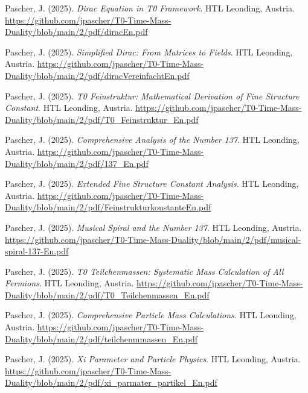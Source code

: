 \documentclass{article}
\begin{document}
\begin{thebibliography}{99}
		Pascher, J. (2025).
		\textit{Dirac Equation in T0 Framework}.
		HTL Leonding, Austria.
		\url{https://github.com/jpascher/T0-Time-Mass-Duality/blob/main/2/pdf/diracEn.pdf}
		
		Pascher, J. (2025).
		\textit{Simplified Dirac: From Matrices to Fields}.
		HTL Leonding, Austria.
		\url{https://github.com/jpascher/T0-Time-Mass-Duality/blob/main/2/pdf/diracVereinfachtEn.pdf}
		
		
		Pascher, J. (2025).
		\textit{T0 Feinstruktur: Mathematical Derivation of Fine Structure Constant}.
		HTL Leonding, Austria.
		\url{https://github.com/jpascher/T0-Time-Mass-Duality/blob/main/2/pdf/T0_Feinstruktur_En.pdf}
		
		Pascher, J. (2025).
		\textit{Comprehensive Analysis of the Number 137}.
		HTL Leonding, Austria.
		\url{https://github.com/jpascher/T0-Time-Mass-Duality/blob/main/2/pdf/137_En.pdf}
		
		Pascher, J. (2025).
		\textit{Extended Fine Structure Constant Analysis}.
		HTL Leonding, Austria.
		\url{https://github.com/jpascher/T0-Time-Mass-Duality/blob/main/2/pdf/FeinstrukturkonstanteEn.pdf}
		
		Pascher, J. (2025).
		\textit{Musical Spiral and the Number 137}.
		HTL Leonding, Austria.
		\url{https://github.com/jpascher/T0-Time-Mass-Duality/blob/main/2/pdf/musical-spiral-137-En.pdf}
		
		
		Pascher, J. (2025).
		\textit{T0 Teilchenmassen: Systematic Mass Calculation of All Fermions}.
		HTL Leonding, Austria.
		\url{https://github.com/jpascher/T0-Time-Mass-Duality/blob/main/2/pdf/T0_Teilchenmassen_En.pdf}
		
		Pascher, J. (2025).
		\textit{Comprehensive Particle Mass Calculations}.
		HTL Leonding, Austria.
		\url{https://github.com/jpascher/T0-Time-Mass-Duality/blob/main/2/pdf/teilchenmmassen_En.pdf}
		
		Pascher, J. (2025).
		\textit{Xi Parameter and Particle Physics}.
		HTL Leonding, Austria.
		\url{https://github.com/jpascher/T0-Time-Mass-Duality/blob/main/2/pdf/xi_parmater_partikel_En.pdf}
		

\end{thebibliography}
\end{document}
